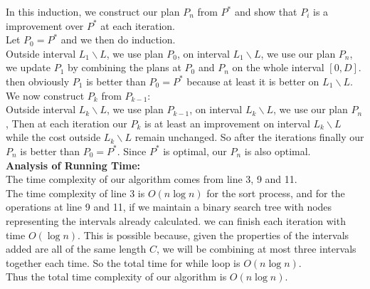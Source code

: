 \documentclass[12pt,letterpaper]{article}
\begin{document}
In this induction, we construct our plan $P_n$ from $P^*$ and show that 
$P_i$ is a improvement over $P^*$ at each iteration.\\
Let $P_0=P^*$ and we then do induction.\\
Outside interval $L_1\backslash L$, we use plan $P_0$,
on interval $L_1\backslash L$, we use our plan $P_n$, 
we update $P_1$ by combining the plans at $P_0$ and $P_n$ on the whole interval $[0,D]$.
then obviously $P_1$ is better than $P_0=P^*$ because at least it is better on $L_1\backslash L$.\\
We now construct $P_{k}$ from $P_{k-1}$:\\
Outside interval $L_k\backslash L$, we use plan $P_{k-1}$,
on interval $L_k\backslash L$, we use our plan $P_n$, 
Then at each iteration our $P_k$ is at least an improvement on interval $L_k\backslash L$
while the cost outside $L_k\backslash L$ remain unchanged.
So after the iterations finally our $P_n$ is better than $P_0=P^*$.
Since $P^*$ is optimal, our $P_n$ is also optimal.\\
\textbf{Analysis of Running Time:}\\
The time complexity of our algorithm comes from line 3, 9 and 11.\\
The time complexity of line 3 is $O(n\log n)$ for the sort process,
and for the operations at line 9 and 11,
if we maintain a binary search tree with nodes representing the intervals already calculated.
we can finish each iteration with time $O(\log n)$.
This is possible because, given the properties of the intervals added are all of the same length $C$,
we will be combining at most three intervals together each time.
So the total time for while loop is $O(n\log n)$.\\
Thus the total time complexity of our algorithm is $O(n\log n)$.
\newpage
\section{}
\end{document}
